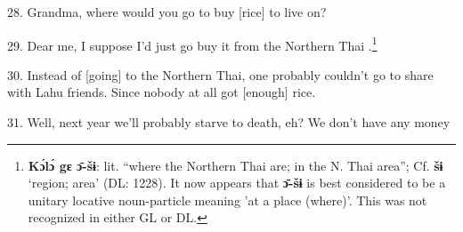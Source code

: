 28. Grandma, where would you go to buy [rice] to live on?

29. Dear me, I suppose I'd just go buy it from the Northern Thai .\footnote{\textbf{Kɔ́lɔ́ gɛ ɔ̄-šɨ}: lit. ``where the Northern Thai are; in the N. Thai area''; Cf. \textbf{šɨ} `region; area'  (DL: 1228). It  now appears that \textbf{ɔ̄-šɨ} is best considered to be a unitary locative noun-particle  meaning 'at a place (where)'. This was not recognized in either GL or DL.}

30. Instead of [going] to the Northern Thai, one probably couldn't go to share
with Lahu friends. Since nobody at all got [enough] rice.

31. Well, next year we'll probably starve to death, eh? We don't have any money
